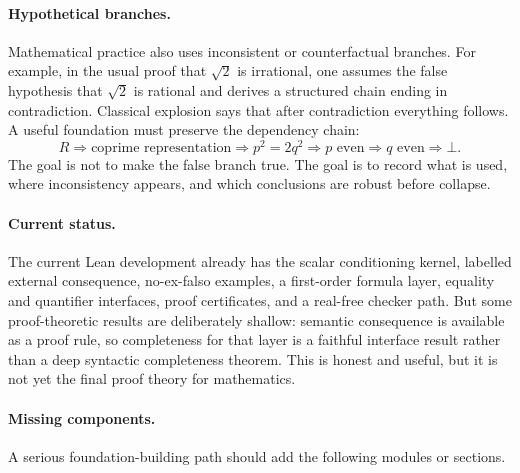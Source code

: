\paragraph{Hypothetical branches.}
Mathematical practice also uses inconsistent or counterfactual branches.  For
example, in the usual proof that $\sqrt2$ is irrational, one assumes the false
hypothesis that $\sqrt2$ is rational and derives a structured chain ending in
contradiction.  Classical explosion says that after contradiction everything
follows.  A useful foundation must preserve the dependency chain:
\[
  R \Rightarrow \text{coprime representation}
    \Rightarrow p^2=2q^2
    \Rightarrow p\text{ even}
    \Rightarrow q\text{ even}
    \Rightarrow \bot.
\]
The goal is not to make the false branch true.  The goal is to record what is
used, where inconsistency appears, and which conclusions are robust before
collapse.

\paragraph{Current status.}
The current Lean development already has the scalar conditioning kernel, labelled
external consequence, no-ex-falso examples, a first-order formula layer, equality
and quantifier interfaces, proof certificates, and a real-free checker path.  But
some proof-theoretic results are deliberately shallow: semantic consequence is
available as a proof rule, so completeness for that layer is a faithful interface
result rather than a deep syntactic completeness theorem.  This is honest and
useful, but it is not yet the final proof theory for mathematics.

\paragraph{Missing components.}
A serious foundation-building path should add the following modules or sections.

